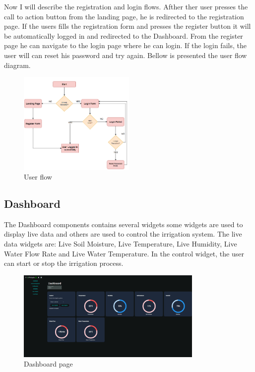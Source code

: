 Now I will describe the registration and login flows. Afther ther user presses the
call to action button from the landing page, he is redirected to the registration page. 
If the users fills the registration form and presses the register button it will be automatically
logged in and redirected to the Dashboard. From the register page he can navigate to the login page where
he can login. If the login fails, the user will can reset his password and try again.
Bellow is presented the user flow diagram.
\begin{figure}[H]
    \centering
    \includegraphics[width=0.5\textwidth]{images/user_flow.png}
    \caption{User flow}
    \label{fig:user-flow}
\end{figure}

\subsection{Dashboard}
The Dashboard components contains several widgets some widgets are used to display live data
and others are used to control the irrigation system. 
The live data widgets are: Live Soil Moisture, Live Temperature, Live Humidity,
Live Water Flow Rate and Live Water Temperature. In the control widget, the user can
start or stop the irrigation process.

\begin{figure}[H]
    \centering
    \includegraphics[width=0.8\textwidth]{images/dashboard.png}
    \caption{Dashboard page}
    \label{fig:dashboard-page}
\end{figure}

